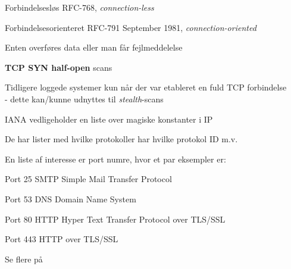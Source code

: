 \documentclass[Screen16to9,17pt]{foils}
\begin{document}
\begin{list1}
\item Forbindelsesløs RFC-768, \emph{connection-less}
\end{list1}


\begin{list1}
\item Forbindelsesorienteret RFC-791 September 1981, \emph{connection-oriented}
\item Enten overføres data eller man får fejlmeddelelse
\end{list1}



\begin{list2}
\item {\bfseries TCP SYN half-open} scans
\item Tidligere loggede systemer kun når der var etableret en fuld TCP
  forbindelse\\
- dette kan/kunne udnyttes til \emph{stealth}-scans
\end{list2}




\begin{list1}
\item IANA vedligeholder en liste over magiske konstanter i IP
\item De har lister med hvilke protokoller har hvilke protokol ID m.v.
\item En liste af interesse er port numre, hvor et par eksempler er:
\begin{list2}
\item Port 25 SMTP Simple Mail Transfer Protocol
\item Port 53 DNS Domain Name System
\item Port 80 HTTP Hyper Text Transfer Protocol over TLS/SSL
\item Port 443 HTTP over TLS/SSL
\end{list2}
\item Se flere på 
\end{list1}

\end{document}
